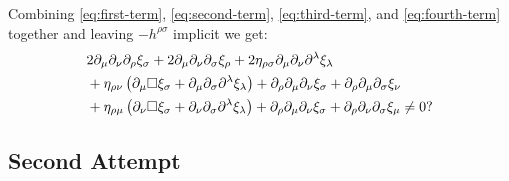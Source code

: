\documentclass[aps,prd,preprint]{revtex4-1}
\begin{document}
Combining \eqref{eq:first-term}, \eqref{eq:second-term}, \eqref{eq:third-term}, and \eqref{eq:fourth-term} together
and leaving $-h^{\rho\sigma}$ implicit we get:
\begin{align}
& 2 \partial_\mu \partial_\nu \partial_\rho \xi_\sigma + 2 \partial_\mu \partial_\nu \partial_\sigma \xi_\rho
  + 2 \eta_{\rho\sigma} \partial_\mu \partial_\nu \partial^\lambda \xi_\lambda \notag \\
& + \eta_{\rho \nu} \left( \partial_\mu \square \xi_\sigma +
    \partial_\mu \partial_\sigma \partial^\lambda \xi_\lambda \right) +
    \partial_\rho \partial_\mu \partial_\nu \xi_\sigma +
    \partial_\rho \partial_\mu \partial_\sigma \xi_\nu \notag \\
& + \eta_{\rho \mu} \left( \partial_\nu \square \xi_\sigma +
    \partial_\nu \partial_\sigma \partial^\lambda \xi_\lambda \right) +
    \partial_\rho \partial_\mu \partial_\nu \xi_\sigma +
    \partial_\rho \partial_\nu \partial_\sigma \xi_\mu \neq 0?
\end{align}

\subsection{Second Attempt}
\end{document}
